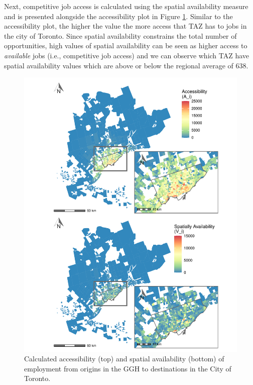 \documentclass[]{elsarticle} %
\begin{document}
Next, competitive job access is calculated using the spatial
availability measure and is presented alongside the accessibility plot
in Figure \ref{fig:plot-access-SA-Toronto-TTS}. Similar to the
accessibility plot, the higher the value the more access that TAZ has to
jobs in the city of Toronto. Since spatial availability constrains the
total number of opportunities, high values of spatial availability can
be seen as higher access to \emph{available} jobs (i.e., competitive job
access) and we can observe which TAZ have spatial availability values
which are above or below the regional average of 638.

\begin{figure}
\includegraphics[width=1\linewidth]{Spatial-Availability_files/figure-latex/plot-access-SA-Toronto-TTS-1} \caption{\label{fig:plot-access-SA-Toronto-TTS}Calculated accessibility (top) and spatial availability (bottom) of employment from origins in the GGH to destinations in the City of Toronto.}\label{fig:plot-access-SA-Toronto-TTS}
\end{figure}
\end{document}
